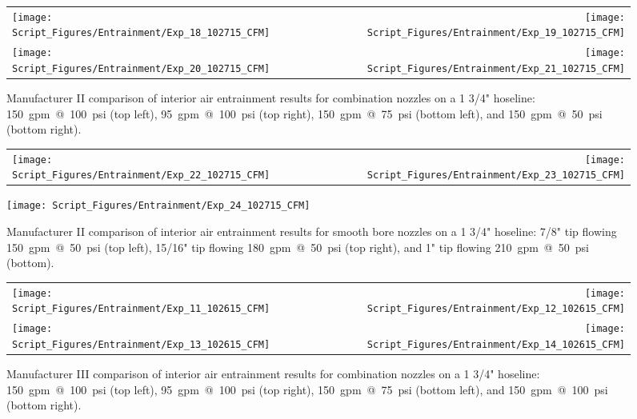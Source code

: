 \documentclass[12pt,oneside]{book}
\begin{document}
\begin{figure}[!ht]
\begin{tabular*}{\textwidth}{lr}
\texttt{[image: Script\_Figures/Entrainment/Exp\_18\_102715\_CFM]} &
\texttt{[image: Script\_Figures/Entrainment/Exp\_19\_102715\_CFM]} \\
\texttt{[image: Script\_Figures/Entrainment/Exp\_20\_102715\_CFM]} &
\texttt{[image: Script\_Figures/Entrainment/Exp\_21\_102715\_CFM]} \\
\end{tabular*}
\caption[Manufacturer II Air Entrainment from Combination Nozzle Varying Pressure and Flowrate]{Manufacturer II comparison of interior air entrainment results for combination nozzles on a 1 3/4" hoseline: 150~gpm~@~100~psi (top left), 95~gpm~@~100~psi (top right), 150~gpm~@~75~psi (bottom left), and 150~gpm~@~50~psi (bottom right).}
\label{fig:1_5_Interior_Combination_Manufacturer_II}
\end{figure}

\clearpage

\begin{figure}[!ht]
\begin{tabular*}{\textwidth}{lr}
\texttt{[image: Script\_Figures/Entrainment/Exp\_22\_102715\_CFM]} &
\texttt{[image: Script\_Figures/Entrainment/Exp\_23\_102715\_CFM]} \\
\end{tabular*}
\centering
\texttt{[image: Script\_Figures/Entrainment/Exp\_24\_102715\_CFM]} 
\caption[Manufacturer II Air Entrainment from Smooth Bore Nozzle Varying Pressure and Flowrate]{Manufacturer II comparison of interior air entrainment results for smooth bore nozzles on a 1 3/4" hoseline: 7/8" tip flowing 150~gpm~@~50~psi (top left), 15/16" tip flowing 180~gpm~@~50~psi (top right), and 1" tip flowing 210~gpm~@~50~psi (bottom).}
\label{fig:1_5_Interior_Smooth_Bore_Manufacturer_II}
\end{figure}

\clearpage

\begin{figure}[!ht]
\begin{tabular*}{\textwidth}{lr}
\texttt{[image: Script\_Figures/Entrainment/Exp\_11\_102615\_CFM]} &
\texttt{[image: Script\_Figures/Entrainment/Exp\_12\_102615\_CFM]} \\
\texttt{[image: Script\_Figures/Entrainment/Exp\_13\_102615\_CFM]} &
\texttt{[image: Script\_Figures/Entrainment/Exp\_14\_102615\_CFM]} \\
\end{tabular*}
\caption[Manufacturer III Air Entrainment from Combination Nozzle Varying Pressure and Flowrate]{Manufacturer III comparison of interior air entrainment results for combination nozzles on a 1 3/4" hoseline: 150~gpm~@~100~psi (top left), 95~gpm~@~100~psi (top right), 150~gpm~@~75~psi (bottom left), and 150~gpm~@~100~psi (bottom right).}
\label{fig:1_5_Interior_Combination_Manufacturer_III}
\end{figure}
\end{document}
